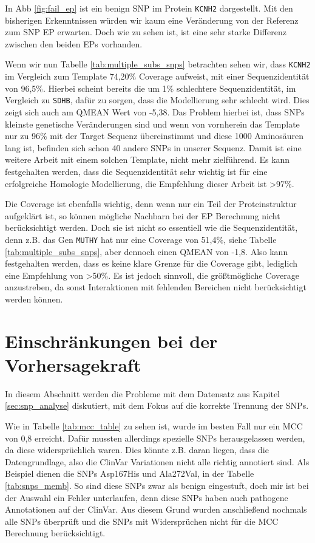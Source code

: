 In \ac{Abb} \ref{fig:fail_ep} ist ein benign \ac{SNP} im Protein \texttt{KCNH2} dargestellt. Mit den bisherigen Erkenntnissen würden wir kaum eine Veränderung von der Referenz zum \ac{SNP} \ac{EP} erwarten. Doch wie zu sehen ist, ist eine sehr starke Differenz zwischen den beiden \ac{EP}s vorhanden. 

Wenn wir nun Tabelle \ref{tab:multiple_subs_snps} betrachten sehen wir, dass \texttt{KCNH2} im Vergleich zum Template 74,20\% Coverage aufweist, mit einer Sequenzidentität von 96,5\%. Hierbei scheint bereits die um 1\% schlechtere Sequenzidentität, im Vergleich zu \texttt{SDHB}, dafür zu sorgen, dass die Modellierung sehr schlecht wird. Dies zeigt sich auch am QMEAN Wert von -5,38. Das Problem hierbei ist, dass \ac{SNP}s kleinste genetische Veränderungen sind und wenn von vornherein das Template nur zu 96\% mit der Target Sequenz übereinstimmt und diese 1000 Aminosäuren lang ist, befinden sich schon 40 andere \ac{SNP}s in unserer Sequenz. Damit ist eine weitere Arbeit mit einem solchen Template, nicht mehr zielführend.
Es kann festgehalten werden, dass die Sequenzidentität sehr wichtig ist für eine erfolgreiche Homologie Modellierung, die Empfehlung dieser Arbeit ist >97\%.

Die Coverage ist ebenfalls wichtig, denn wenn nur ein Teil der Proteinstruktur aufgeklärt ist, so können mögliche Nachbarn bei der \ac{EP} Berechnung nicht berücksichtigt werden. Doch sie ist nicht so essentiell wie die Sequenzidentität, denn z.B. das Gen \texttt{MUTHY} hat nur eine Coverage von 51,4\%, siehe Tabelle \ref{tab:multiple_subs_snps}, aber dennoch einen QMEAN von -1,8. Also kann festgehalten werden, dass es keine klare Grenze für die Coverage gibt, lediglich eine Empfehlung von >50\%. Es ist jedoch sinnvoll, die größtmögliche Coverage anzustreben, da sonst Interaktionen mit fehlenden Bereichen nicht berücksichtigt werden können.




\section{Einschränkungen bei der Vorhersagekraft}
\label{sec:probleme_mit_dem_datensatz}

In diesem Abschnitt werden die Probleme mit dem Datensatz aus Kapitel \ref{sec:snp_analyse} diskutiert, mit dem Fokus auf die korrekte Trennung der \ac{SNP}s.

Wie in Tabelle \ref{tab:mcc_table} zu sehen ist, wurde im besten Fall nur ein MCC von 0,8 erreicht. Dafür mussten allerdings spezielle \ac{SNP}s herausgelassen werden, da diese widersprüchlich waren. Dies könnte z.B. daran liegen, dass die Datengrundlage, also die ClinVar Variationen nicht alle richtig annotiert sind. Als Beispiel dienen die \ac{SNP}s Asp167His und Ala272Val, in der Tabelle \ref{tab:snps_memb}. So sind diese \ac{SNP}s zwar als benign eingestuft, doch mir ist bei der Auswahl ein Fehler unterlaufen, denn diese \ac{SNP}s haben auch pathogene Annotationen auf der ClinVar. Aus diesem Grund wurden anschließend nochmals alle \ac{SNP}s überprüft und die \ac{SNP}s mit Widersprüchen nicht für die MCC Berechnung berücksichtigt.

